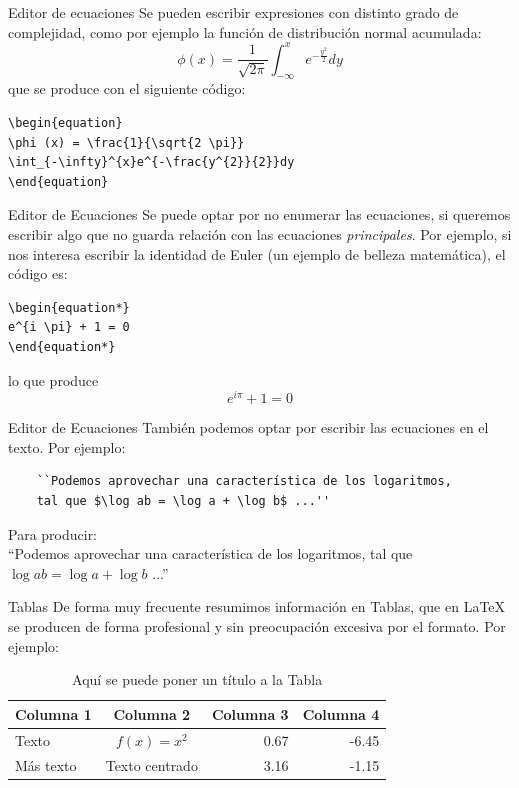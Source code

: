 \documentclass[compress,svgnames]{beamer}
\begin{document}
\begin{frame}[fragile]{Editor de ecuaciones}
Se pueden escribir expresiones con distinto grado de complejidad, como por ejemplo la función de distribución normal acumulada:
\begin{equation}
\phi (x) = \frac{1}{\sqrt{2 \pi}} \int_{-\infty}^{x}e^{-\frac{y^{2}}{2}}dy
\end{equation}
que se produce con el siguiente código:
\begin{lstlisting}
\begin{equation}
\phi (x) = \frac{1}{\sqrt{2 \pi}} 
\int_{-\infty}^{x}e^{-\frac{y^{2}}{2}}dy
\end{equation}
\end{lstlisting}
\end{frame}

\begin{frame}[fragile]{Editor de Ecuaciones}
Se puede optar por no enumerar las ecuaciones, si queremos escribir algo que no guarda relación con las ecuaciones \emph{principales}. Por ejemplo, si nos interesa escribir la identidad de Euler (un ejemplo de belleza matemática), el código es:
\begin{lstlisting}
\begin{equation*}
e^{i \pi} + 1 = 0
\end{equation*}
\end{lstlisting}
lo que produce
\begin{equation*}
e^{i \pi} + 1 = 0
\end{equation*}
\end{frame}

\begin{frame}[fragile]{Editor de Ecuaciones}
	También podemos optar por escribir las ecuaciones en el texto. Por ejemplo:
	\begin{lstlisting}
	``Podemos aprovechar una característica de los logaritmos, 
	tal que $\log ab = \log a + \log b$ ...''
	\end{lstlisting}
	Para producir:\\ ``Podemos aprovechar una característica de los logaritmos, tal que 
	$\log ab = \log a + \log b$ ...''
\end{frame}

\begin{frame}[fragile]{Tablas}
De forma muy frecuente resumimos información en Tablas, que en \LaTeX{} se producen de forma profesional y sin preocupación excesiva por el formato. Por ejemplo:
\begin{table}[H]
\centering
\caption{Aquí se puede poner un título a la Tabla}
\begin{tabular}{lcrr}
\hline \hline 
Columna 1				& Columna 2				& Columna 3				& Columna 4\\
\hline 
Texto					& $f(x) = x^{2}$		& 0.67					& -6.45\\
Más texto				& Texto centrado		& 3.16					& -1.15\\
\hline \hline
\end{tabular}
\end{table}
\end{frame}
\end{document}
